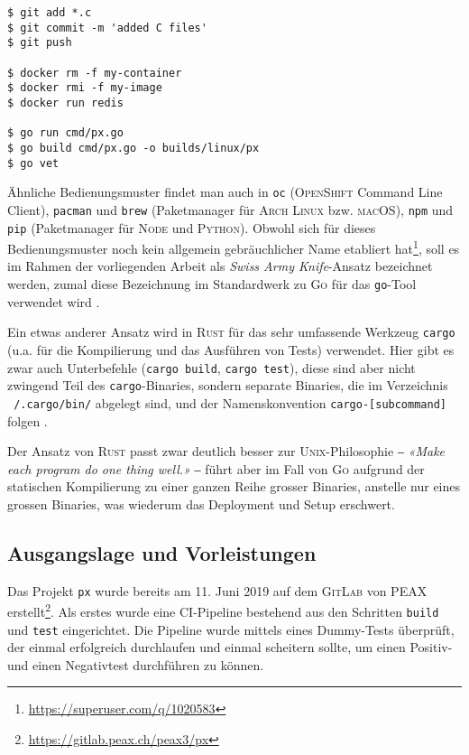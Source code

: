 \begin{lstlisting}[caption={Einie Kommandozeilenbeispiele mit Haupt- und Unterbefehl}]
$ git add *.c
$ git commit -m 'added C files'
$ git push

$ docker rm -f my-container
$ docker rmi -f my-image
$ docker run redis

$ go run cmd/px.go
$ go build cmd/px.go -o builds/linux/px
$ go vet
\end{lstlisting}

Ähnliche Bedienungsmuster findet man auch in \texttt{oc} (\textsc{OpenShift} Command Line Client), \texttt{pacman} und \texttt{brew} (Paketmanager für \textsc{Arch Linux} bzw. \textsc{macOS}), \texttt{npm} und \texttt{pip} (Paketmanager für \textsc{Node} und \textsc{Python}). Obwohl sich für dieses Bedienungsmuster noch kein allgemein gebräuchlicher Name etabliert hat\footnote{\url{https://superuser.com/q/1020583}}, soll es im Rahmen der vorliegenden Arbeit als \textit{Swiss Army Knife}-Ansatz bezeichnet werden, zumal diese Bezeichnung im Standardwerk zu \textsc{Go} für das \texttt{go}-Tool verwendet wird \cite{gopl}.

Ein etwas anderer Ansatz wird in \textsc{Rust} für das sehr umfassende Werkzeug \texttt{cargo} (u.a. für die Kompilierung und das Ausführen von Tests) verwendet. Hier gibt es zwar auch Unterbefehle (\texttt{cargo build}, \texttt{cargo test}), diese sind aber nicht zwingend Teil des \texttt{cargo}-Binaries, sondern separate Binaries, die im Verzeichnis \texttt{~/.cargo/bin/} abgelegt sind, und der Namenskonvention \texttt{cargo-[subcommand]} folgen \cite[Kapitel 14.5]{rust-book}.

Der Ansatz von \textsc{Rust} passt zwar deutlich besser zur \textsc{Unix}-Philosophie ‒ \textit{«Make each program do one thing well.»} \cite[S. 3]{unixtimesharing} ‒ führt aber im Fall von \textsc{Go} aufgrund der statischen Kompilierung zu einer ganzen Reihe grosser Binaries, anstelle nur eines grossen Binaries, was wiederum das Deployment und Setup erschwert.

\subsection{Ausgangslage und Vorleistungen}
\label{sec:Ausgangslage-und-Vorleistungen}

Das Projekt \texttt{px} wurde bereits am 11. Juni 2019 auf dem \textsc{GitLab} von PEAX erstellt\footnote{\url{https://gitlab.peax.ch/peax3/px}}. Als erstes wurde eine CI-Pipeline bestehend aus den Schritten \texttt{build} und \texttt{test} eingerichtet. Die Pipeline wurde mittels eines Dummy-Tests überprüft, der einmal erfolgreich durchlaufen und einmal scheitern sollte, um einen Positiv- und einen Negativtest durchführen zu können.

